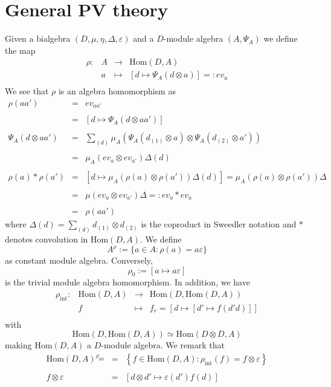 \documentclass[10pt,a4paper]{article}
\newcommand{\eps}{\varepsilon}
\begin{document}
\section{General PV theory}
Given a bialgebra $(D, \mu, \eta, \Delta, \eps)$ and a $D$-module algebra $(A, \Psi_A)$ we define the map
$$\begin{array}{rrcl}
\rho :& A & \longrightarrow &\mathrm{Hom}(D, A)\\
& a &\longmapsto & \left[d \longmapsto \Psi_A(d \otimes a)\right] =: ev_a\\
\end{array}$$
We see that $\rho$ is an algebra homomorphism as
$$\begin{array}{rcl}
\rho(a a') &=& ev_{a a'}\\
&&\\
 &=& \left[d \longmapsto \Psi_A(d \otimes a a')\right]\\%
 &&\\
 \Psi_A(d \otimes a a') &=& \sum_{(d)} \mu_A\left(\Psi_A\left(d_{(1)} \otimes a\right) \otimes \Psi_A\left(d_{(2)} \otimes a'\right)\right)\\
 &&\\
 &=& \mu_A(ev_a \otimes ev_{a'}) \Delta(d)\\
 &&\\
\rho(a) \ast \rho(a') &=& \left[d \longmapsto \mu_A(\rho(a) \otimes \rho(a'))\Delta(d)\right] = \mu_A(\rho(a) \otimes \rho(a')) \Delta\\
&&\\
 &=& \mu(ev_a \otimes ev_{a'})\Delta =: ev_a \ast ev_{a}\\
 &&\\
 &=& \rho(a a')
\end{array}$$
where $\Delta(d) = \sum_{(d)} d_{(1)} \otimes d_{(2)}$ is the coproduct in Sweedler notation and $\ast$ denotes convolution in $\mathrm{Hom}(D,A)$. We define
$$A^\rho := \{a \in A : \rho(a) = a \eps\}$$
as constant module algebra. Conversely,
$$\rho_0 := \left[a \longmapsto a \eps\right]$$
is the trivial module algebra homomorphism. In addition, we have
$$\begin{array}{rrcl}
\rho_{\mathrm{int}} :& \mathrm{Hom}(D, A) &\longrightarrow &\mathrm{Hom}(D, \mathrm{Hom}(D, A))\\
& f& \longmapsto& f_r = \left[d \longmapsto \left[d' \longmapsto f(d' d)\right]\right]\\
\end{array}$$
with
$$\mathrm{Hom}\left(D, \mathrm{Hom}(D,A)\right) \simeq \mathrm{Hom}(D \otimes D, A)$$
making $\mathrm{Hom}(D,A)$ a $D$-module algebra. We remark that
$$\begin{array}{rcl}
\mathrm{Hom}(D, A)^{\rho_{\mathrm{int}}} &=& \left\{f \in \mathrm{Hom}(D, A) : \rho_{\mathrm{int}}(f) = f \otimes \eps\right\}\\
&&\\
f \otimes \eps &=& \left[d \otimes d' \longmapsto \eps(d')f(d)\right]\\
\end{array}$$
\end{document}
